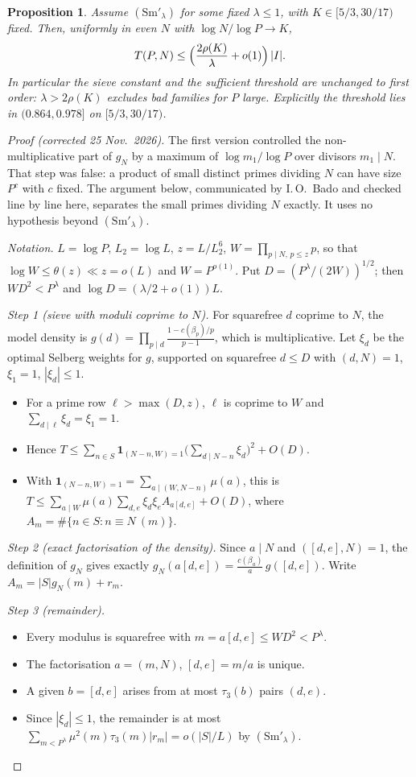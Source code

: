 \documentclass[11pt,a4paper]{article}
\newtheorem{proposition}{Proposition}
\theoremstyle{remark}
\begin{document}
\begin{proposition}\label{prop:sm}
Assume $(\mathrm{Sm}'_\lambda)$ for some fixed $\lambda\le1$, with $K\in[5/3,30/17)$ fixed. Then, uniformly in even $N$ with
$\log N/\log P\to K$,
\[
T(P,N)\le\Bigl(\frac{2\rho(K)}\lambda+o(1)\Bigr)\,|I| .
\]
In particular the sieve constant and the sufficient threshold are \emph{unchanged} to first order: $\lambda>2\rho(K)$ excludes bad
families for $P$ large. Explicitly the threshold lies in $(0.864,0.978]$ on $[5/3,30/17)$.
\end{proposition}
\begin{proof}[Proof (corrected 25 Nov.~2026)]
The first version controlled the non-multiplicative part of $g_N$ by a maximum of $\log m_1/\log P$ over divisors
$m_1\mid N$. That step was false: a product of small distinct primes dividing $N$ can have size $P^{c}$ with $c$ fixed.
The argument below, communicated by I.\,O.~Bado and checked line by line here, separates the small primes dividing $N$
exactly. It uses no hypothesis beyond $(\mathrm{Sm}'_\lambda)$.

\emph{Notation.} $L=\log P$, $L_2=\log L$, $z=L/L_2^{6}$, $W=\prod_{p\mid N,\,p\le z}p$, so that $\log W\le\theta(z)\ll z=o(L)$ and
$W=P^{o(1)}$. Put $D=(P^\lambda/(2W))^{1/2}$; then $WD^2<P^\lambda$ and $\log D=(\lambda/2+o(1))L$.

\emph{Step 1 (sieve with moduli coprime to $N$).} For squarefree $d$ coprime to $N$, the model density is
$g(d)=\prod_{p\mid d}\frac{1-c(\beta_p)/p}{p-1}$, which is multiplicative. Let $\xi_d$ be the optimal Selberg weights for $g$, supported
on squarefree $d\le D$ with $(d,N)=1$, $\xi_1=1$, $|\xi_d|\le1$.
\begin{itemize}
\item For a prime row $\ell>\max(D,z)$, $\ell$ is coprime to $W$ and $\sum_{d\mid\ell}\xi_d=\xi_1=1$.
\item Hence $T\le\sum_{n\in S}\mathbf 1_{(N-n,W)=1}\bigl(\sum_{d\mid N-n}\xi_d\bigr)^2+O(D)$.
\item With $\mathbf 1_{(N-n,W)=1}=\sum_{a\mid(W,N-n)}\mu(a)$, this is
$T\le\sum_{a\mid W}\mu(a)\sum_{d,e}\xi_d\xi_eA_{a[d,e]}+O(D)$, where $A_m=\#\{n\in S:n\equiv N\ (m)\}$.
\end{itemize}

\emph{Step 2 (exact factorisation of the density).} Since $a\mid N$ and $([d,e],N)=1$, the definition of $g_N$ gives exactly
$g_N(a[d,e])=\frac{c(\beta_a)}a\,g([d,e])$. Write $A_m=|S|g_N(m)+r_m$.

\emph{Step 3 (remainder).}
\begin{itemize}
\item Every modulus is squarefree with $m=a[d,e]\le WD^2<P^\lambda$.
\item The factorisation $a=(m,N)$, $[d,e]=m/a$ is unique.
\item A given $b=[d,e]$ arises from at most $\tau_3(b)$ pairs $(d,e)$.
\item Since $|\xi_d|\le1$, the remainder is at most $\sum_{m<P^\lambda}\mu^2(m)\tau_3(m)|r_m|=o(|S|/L)$ by $(\mathrm{Sm}'_\lambda)$.
\end{itemize}


\end{proof}
\end{document}
